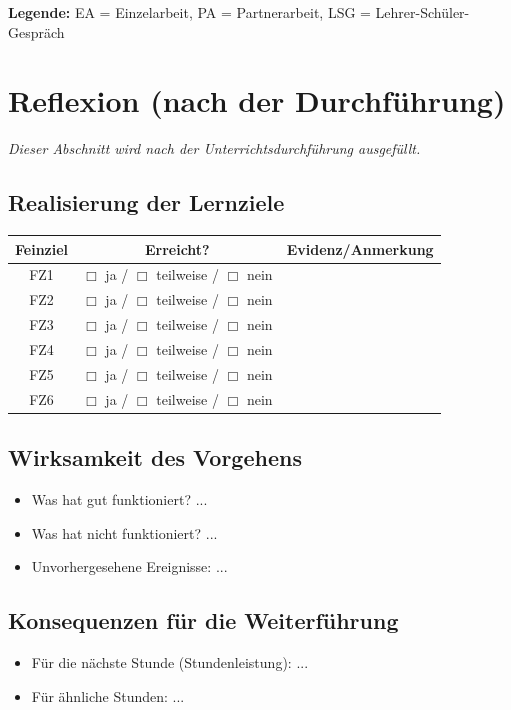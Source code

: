 \documentclass[11pt,a4paper]{article}
\begin{document}
\textbf{Legende:} EA = Einzelarbeit, PA = Partnerarbeit, LSG = Lehrer-Schüler-Gespräch

\section{Reflexion (nach der Durchführung)}

\textit{Dieser Abschnitt wird nach der Unterrichtsdurchführung ausgefüllt.}

\subsection{Realisierung der Lernziele}
\begin{tabular}{|c|c|l|}
\hline
\textbf{Feinziel} & \textbf{Erreicht?} & \textbf{Evidenz/Anmerkung} \\
\hline
FZ1 & $\Box$ ja / $\Box$ teilweise / $\Box$ nein & \\
\hline
FZ2 & $\Box$ ja / $\Box$ teilweise / $\Box$ nein & \\
\hline
FZ3 & $\Box$ ja / $\Box$ teilweise / $\Box$ nein & \\
\hline
FZ4 & $\Box$ ja / $\Box$ teilweise / $\Box$ nein & \\
\hline
FZ5 & $\Box$ ja / $\Box$ teilweise / $\Box$ nein & \\
\hline
FZ6 & $\Box$ ja / $\Box$ teilweise / $\Box$ nein & \\
\hline
\end{tabular}

\subsection{Wirksamkeit des Vorgehens}
\begin{itemize}
    \item Was hat gut funktioniert? ...
    \item Was hat nicht funktioniert? ...
    \item Unvorhergesehene Ereignisse: ...
\end{itemize}

\subsection{Konsequenzen für die Weiterführung}
\begin{itemize}
    \item Für die nächste Stunde (Stundenleistung): ...
    \item Für ähnliche Stunden: ...
\end{itemize}
\end{document}
